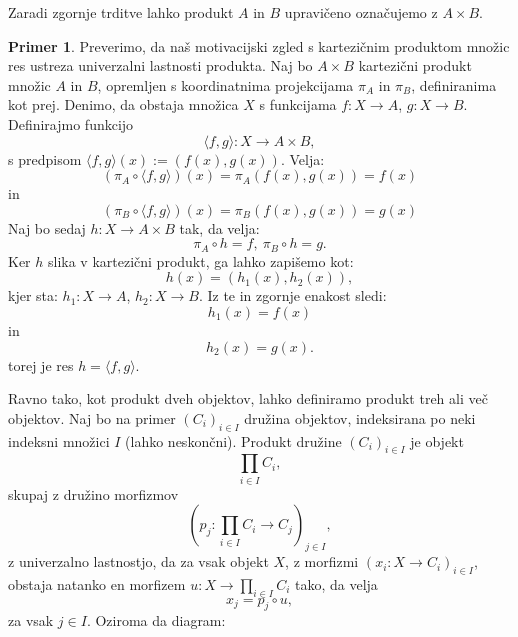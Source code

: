 \documentclass[12pt,a4paper]{book}
\theoremstyle{definition}
\theoremstyle{plain}
\theoremstyle{definition}
\newtheorem{primer}{Primer}[section]
\theoremstyle{remark}
\begin{document}
Zaradi zgornje trditve lahko produkt $A$ in $B$ upravičeno označujemo z $A \times B$.
%
\begin{primer} \label{konstrukcija produktov v Set}
Preverimo, da naš motivacijski zgled s kartezičnim produktom množic res ustreza univerzalni lastnosti produkta. Naj bo $A \times B$ kartezični produkt množic $A$ in $B$, opremljen s koordinatnima projekcijama $\pi_A$ in $\pi_B$, definiranima kot prej. Denimo, da obstaja množica $X$ s funkcijama $f : X \to A$, $g : X \to B$. Definirajmo funkcijo 
$$\langle f,g \rangle : X \to A \times B,$$
s predpisom $\langle f,g \rangle(x) := (f(x),g(x))$. Velja:
$$ (\pi_A \circ \langle f,g \rangle)(x) = \pi_A(f(x),g(x)) = f(x) $$
in 
$$ (\pi_B \circ \langle f,g \rangle)(x) = \pi_B(f(x),g(x)) = g(x) $$
Naj bo sedaj $h : X \to A \times B$ tak, da velja:
$$\pi_A \circ h = f, \ \pi_B \circ h = g.$$
Ker $h$ slika v kartezični produkt, ga lahko zapišemo kot:
$$h(x) = (h_1(x),h_2(x)),$$
kjer sta: $h_1 : X \to A$, $h_2 : X \to B$.
Iz te in zgornje enakost sledi:
$$h_1(x) = f(x)$$
in $$h_2(x) = g(x).$$
torej je res $h = \langle f,g \rangle$.
\end{primer}
%
Ravno tako, kot produkt dveh objektov, lahko definiramo produkt treh ali več objektov. Naj bo na primer $(C_i)_{i \in I}$ družina objektov, indeksirana po neki indeksni množici $I$ (lahko neskončni). Produkt družine $(C_i)_{i \in I}$ je objekt
$$\prod_{i \in I}C_i,$$
skupaj z družino morfizmov 
$$(p_j : \prod_{i \in I}C_i \to C_j)_{j \in I},$$
z univerzalno lastnostjo, da za vsak objekt $X$, z morfizmi $(x_i : X \to C_i)_{i \in I}$, obstaja natanko en morfizem $u : X \to \prod_{i \in I}C_i$ tako, da velja
$$x_j = p_j \circ u,$$
za vsak $j \in I$. Oziroma da diagram:
\end{document}
